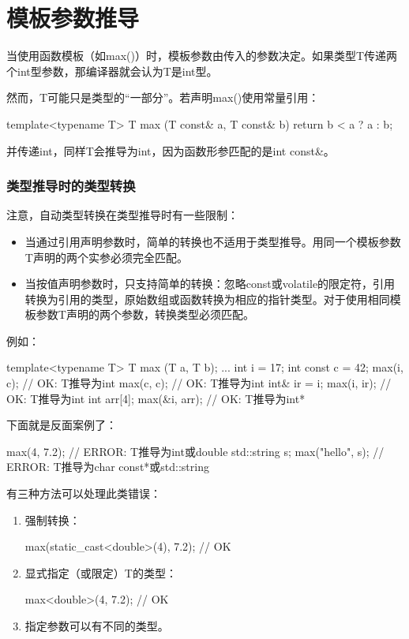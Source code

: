 \section{模板参数推导}

当使用函数模板（如max()）时，模板参数由传入的参数决定。如果类型T传递两个int型参数，那编译器就会认为T是int型。

然而，T可能只是类型的“一部分”。若声明max()使用常量引用：

\begin{cpp}
template<typename T>
T max (T const& a, T const& b)
{
	return b < a ? a : b;
}
\end{cpp}

并传递int，同样T会推导为int，因为函数形参匹配的是int const\&。

\subsubsection{类型推导时的类型转换}

注意，自动类型转换在类型推导时有一些限制：

\begin{itemize}
\item
当通过引用声明参数时，简单的转换也不适用于类型推导。用同一个模板参数T声明的两个实参必须完全匹配。

\item
当按值声明参数时，只支持简单的转换：忽略const或volatile的限定符，引用转换为引用的类型，原始数组或函数转换为相应的指针类型。对于使用相同模板参数T声明的两个参数，转换类型必须匹配。
\end{itemize}

例如：

\begin{cpp}
template<typename T>
T max (T a, T b);
...
int i = 17;
int const c = 42;
max(i, c); // OK: T推导为int
max(c, c); // OK: T推导为int
int& ir = i;
max(i, ir); // OK: T推导为int
int arr[4];
max(&i, arr); // OK: T推导为int*
\end{cpp}

下面就是反面案例了：

\begin{cpp}
max(4, 7.2); // ERROR: T推导为int或double
std::string s;
max("hello", s); // ERROR: T推导为char const*或std::string
\end{cpp}

有三种方法可以处理此类错误：

\begin{enumerate}
\item
强制转换：
\begin{cpp}
max(static_cast<double>(4), 7.2); // OK
\end{cpp}

\item
显式指定（或限定）T的类型：
\begin{cpp}
max<double>(4, 7.2); // OK
\end{cpp}

\item
指定参数可以有不同的类型。
\end{enumerate}


